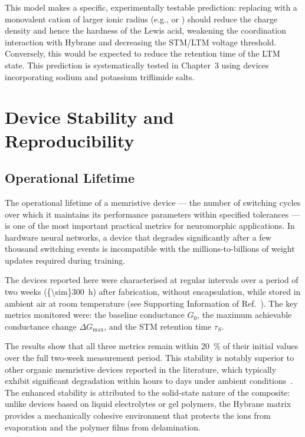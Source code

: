 \documentclass[12pt, a4paper, twoside]{report}
\begin{document}
This model makes a specific, experimentally testable prediction: replacing  with a monovalent cation of larger ionic radius (e.g.,  or ) should reduce the charge density and hence the hardness of the Lewis acid, weakening the coordination interaction with Hybrane and decreasing the STM/LTM voltage threshold. Conversely, this would be expected to reduce the retention time of the LTM state. This prediction is systematically tested in Chapter~3 using devices incorporating sodium and potassium triflimide salts.


\section{Device Stability and Reproducibility}\label{sec:stability}

\subsection{Operational Lifetime}\label{subsec:lifetime}

The operational lifetime of a memristive device — the number of switching cycles over which it maintains its performance parameters within specified tolerances — is one of the most important practical metrics for neuromorphic applications. In hardware neural networks, a device that degrades significantly after a few thousand switching events is incompatible with the millions-to-billions of weight updates required during training.

The devices reported here were characterised at regular intervals over a period of two weeks (\SI{{\sim}300}{\hour}) after fabrication, without encapsulation, while stored in ambient air at room temperature (see Supporting Information of Ref.~\cite{PradoSocorro2022}). The key metrics monitored were: the baseline conductance $G_0$, the maximum achievable conductance change $\Delta G_{\mathrm{max}}$, and the STM retention time $\tau_S$.

The results show that all three metrics remain within \SI{20}{\percent} of their initial values over the full two-week measurement period. This stability is notably superior to other organic memristive devices reported in the literature, which typically exhibit significant degradation within hours to days under ambient conditions~\cite{Shih2017}. The enhanced stability is attributed to the solid-state nature of the composite: unlike devices based on liquid electrolytes or gel polymers, the Hybrane matrix provides a mechanically cohesive environment that protects the ions from evaporation and the polymer films from delamination.
\end{document}
